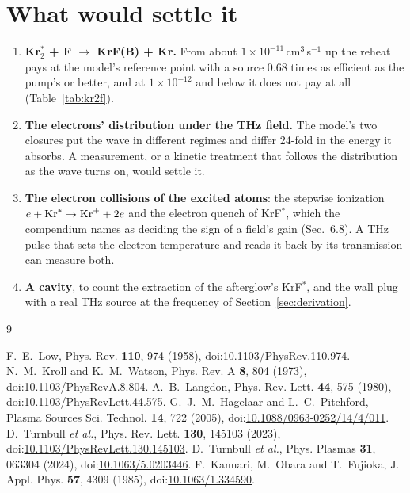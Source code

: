 \documentclass[11pt]{article}
\newcommand{\Krts}{Kr\ensuremath{_2^*}}
\newcommand{\KrF}{KrF\ensuremath{^*}}
\begin{document}
\section{What would settle it}
\label{sec:settle}
\begin{enumerate}[leftmargin=1.6em]
\item \textbf{\Krts{} + F $\to$ KrF(B) + Kr.} From about $1\times10^{-11}$\,cm$^3$\,s$^{-1}$ up the
  reheat pays at the model's reference point with a source 0.68 times as efficient as the pump's
  or better, and at $1\times10^{-12}$ and below it does not pay at all (Table~\ref{tab:kr2f}).
\item \textbf{The electrons' distribution under the THz field.} The model's two closures put the
  wave in different regimes and differ 24-fold in the energy it absorbs. A measurement, or a
  kinetic treatment that follows the distribution as the wave turns on, would settle it.
\item \textbf{The electron collisions of the excited atoms}: the stepwise ionization
  $e+{\rm Kr}^*\to{\rm Kr}^++2e$ and the electron quench of \KrF{}, which the compendium names as
  deciding the sign of a field's gain (Sec.~6.8). A THz pulse that sets the electron temperature
  and reads it back by its transmission can measure both.
\item \textbf{A cavity}, to count the extraction of the afterglow's \KrF{}, and the wall plug with a
  real THz source at the frequency of Section~\ref{sec:derivation}.
\end{enumerate}

\begin{thebibliography}{9}
\raggedright
{} F.~E.~Low, Phys. Rev. \textbf{110}, 974 (1958),
doi:\href{https://doi.org/10.1103/PhysRev.110.974}{10.1103/PhysRev.110.974}.
 N.~M.~Kroll and K.~M.~Watson, Phys. Rev. A \textbf{8}, 804 (1973),
doi:\href{https://doi.org/10.1103/PhysRevA.8.804}{10.1103/PhysRevA.8.804}.
 A.~B.~Langdon, Phys. Rev. Lett. \textbf{44}, 575 (1980),
doi:\href{https://doi.org/10.1103/PhysRevLett.44.575}{10.1103/PhysRevLett.44.575}.
 G.~J.~M.~Hagelaar and L.~C.~Pitchford, Plasma Sources Sci. Technol.
\textbf{14}, 722 (2005), doi:\href{https://doi.org/10.1088/0963-0252/14/4/011}{10.1088/0963-0252/14/4/011}.
 D.~Turnbull \emph{et al.}, Phys. Rev. Lett. \textbf{130}, 145103 (2023),
doi:\href{https://doi.org/10.1103/PhysRevLett.130.145103}{10.1103/PhysRevLett.130.145103}.
 D.~Turnbull \emph{et al.}, Phys. Plasmas \textbf{31}, 063304 (2024),
doi:\href{https://doi.org/10.1063/5.0203446}{10.1063/5.0203446}.
 F.~Kannari, M.~Obara and T.~Fujioka, J. Appl. Phys. \textbf{57}, 4309
(1985), doi:\href{https://doi.org/10.1063/1.334590}{10.1063/1.334590}.
\end{thebibliography}
\end{document}
